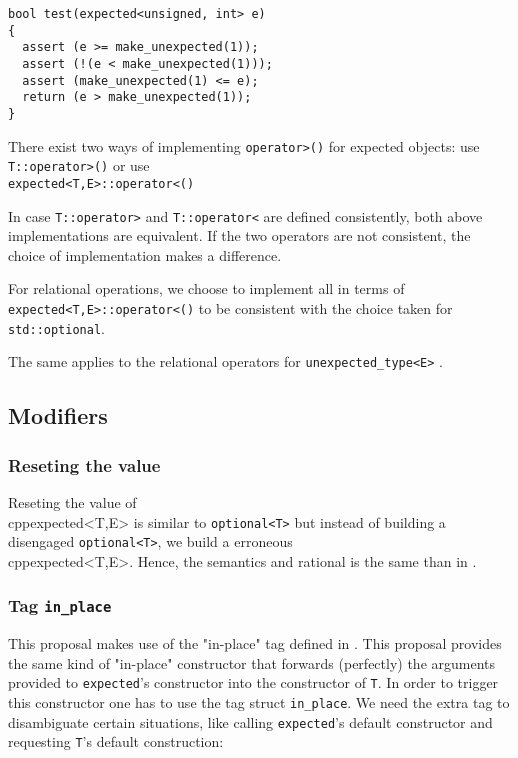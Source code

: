 \documentclass[a4paper,10pt]{article}
\newcommand{\cpp}[1]{\lstinline{#1}}
\begin{document}
\begin{lstlisting}
bool test(expected<unsigned, int> e)
{
  assert (e >= make_unexpected(1));    
  assert (!(e < make_unexpected(1)));  
  assert (make_unexpected(1) <= e);    
  return (e > make_unexpected(1));     
}
\end{lstlisting}

There exist two ways of implementing \cpp{operator>()} for expected objects: use \cpp{T::operator>()} or use \\
 \cpp{expected<T,E>::operator<()}

In case \cpp{T::operator>} and \cpp{T::operator<} are defined consistently, both above implementations are equivalent. If the two operators are not consistent, the choice of implementation makes a difference. 

For relational operations, we choose to implement all in terms of  \cpp{expected<T,E>::operator<()} to be consistent with the choice taken for \cpp{std::optional}.

The same applies to the relational operators for \cpp{unexpected_type<E>} .

\subsection{Modifiers}

\subsubsection{Reseting the value}

Reseting the value of \\cpp{expected<T,E>} is similar to \cpp{optional<T>} but instead of building a disengaged \cpp{optional<T>}, we build a erroneous \\cpp{expected<T,E>}. Hence, the semantics and rational is the same than in \cite{OptionalRev4}.

\subsubsection{Tag \cpp{in_place}}

This proposal makes use of the "in-place" tag defined in \cite{OptionalRev5}. This proposal  provides the same kind of "in-place" constructor that forwards (perfectly) the arguments provided to \cpp{expected}'s constructor into the constructor of \cpp{T}. In order to trigger this constructor one has to use the tag struct \cpp{in_place}. We need the extra tag to disambiguate certain situations, like calling \cpp{expected}'s default constructor and requesting \cpp{T}'s default construction:
\end{document}
